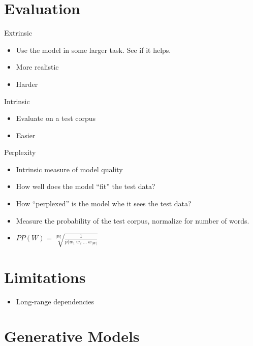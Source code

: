 \documentclass[11pt,letterpaper]{article}
\begin{document}
\section{Evaluation}

Extrinsic

\begin{itemize}
  \item Use the model in some larger task.  See if it helps.
  \item More realistic
  \item Harder
\end{itemize}

Intrinsic

\begin{itemize}
  \item Evaluate on a test corpus
  \item Easier
\end{itemize}

Perplexity

\begin{itemize}
  \item Intrinsic measure of model quality
  \item How well does the model ``fit'' the test data?
  \item How ``perplexed'' is the model whe it sees the test data?
  \item Measure the probability of the test corpus, normalize for number of words.
  \item $PP(W) = \sqrt[|W|]{\frac{1}{p(w_1~w_2~...~w_{|W|}}}$
\end{itemize}




\section{Limitations}

\begin{itemize}
  \item Long-range dependencies
\end{itemize}




\section{Generative Models}
\end{document}
